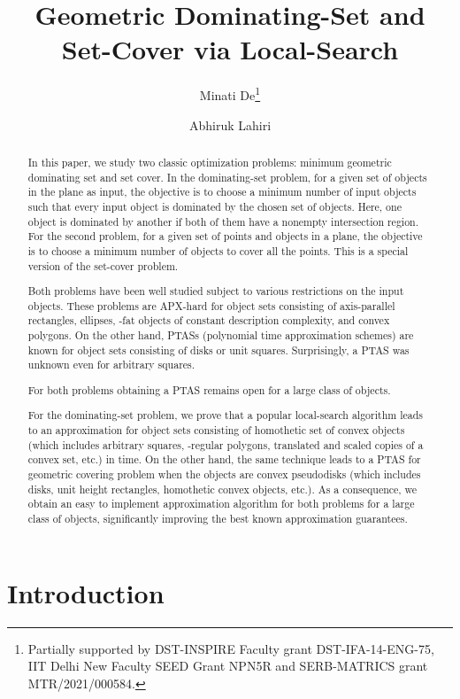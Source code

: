 \documentclass[a4paper,11pt]{article}
\title{Geometric  Dominating-Set and Set-Cover via Local-Search}
\author[1]{Minati De\footnote{Partially supported by DST-INSPIRE Faculty grant DST-IFA-14-ENG-75,   IIT Delhi New Faculty SEED Grant  NPN5R and SERB-MATRICS grant MTR/2021/000584.}}
\affil{Deptartment of Mathematics\\ Indian Institute of  
Technology Delhi, India\\
\texttt{minati@maths.iitd.ac.in}
}
\author[2]{Abhiruk Lahiri}
\affil{Department of Computer Science and Automation\\ Indian Institute of Science, Bangalore, India\\
\texttt{abhiruk@iisc.ac.in}
}
\date{}
\begin{document}
\maketitle
\begin{abstract}
In this paper, we study two classic optimization  problems: minimum geometric dominating 
set and set 
cover. In the dominating-set problem, for  a given set of objects in {the} plane as input, the 
objective is to choose a  minimum number of input objects such 
that every input object is dominated by the chosen set of objects. Here, one 
object is dominated by  {another} if both of them have {a} nonempty intersection 
region. 
For the second problem, for a given  set of points and  
objects {in a plane}, the objective is to choose {a} minimum number of objects
 to cover all the points. This is a special version of the set-cover problem. 

{Both problems have been well studied subject to various restrictions on the input objects.}
These problems {are} 
APX-hard {for object sets} consisting of axis-parallel rectangles, ellipses, -fat 
objects 
of constant description complexity, and convex polygons. On the other hand, 
PTASs (polynomial time approximation schemes) are known  {for object sets} consisting of disks or unit squares. 
Surprisingly, {a} PTAS was unknown even 
for arbitrary squares. 

 For both  problems 
obtaining a PTAS remains open for a large class of objects. 

For the dominating-set problem, we prove that {a} popular local-search 
algorithm leads to an   approximation for object sets consisting of homothetic set of convex objects (which includes   arbitrary squares, -regular polygons, translated and scaled copies of a convex set, etc.) in  time. 
On the other 
hand, the same technique leads to a PTAS  for geometric covering problem when 
the 
objects are  convex pseudodisks (which includes disks, unit height rectangles, homothetic convex objects, etc.). 
As a consequence, we obtain an  easy to implement approximation algorithm for both problems for a large class of objects,  significantly improving the best 
known approximation guarantees. 

\end{abstract}

\section{Introduction}
\end{document}
